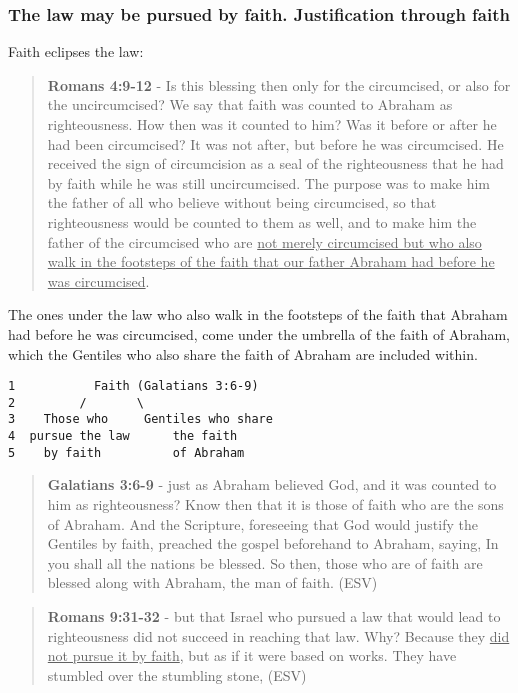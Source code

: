 \documentclass[11pt]{article}
\begin{document}
\subsubsection{The law may be pursued by faith. Justification through faith}
\label{sec:orgaf86b33}

Faith eclipses the law:

\begin{quote}
\textbf{Romans 4:9-12} - Is this blessing then only for the circumcised, or also for the uncircumcised? We say that faith was counted to Abraham as righteousness. How then was it counted to him? Was it before or after he had been circumcised? It was not after, but before he was circumcised. He received the sign of circumcision as a seal of the righteousness that he had by faith while he was still uncircumcised. The purpose was to make him the father of all who believe without being circumcised, so that righteousness would be counted to them as well, and to make him the father of the circumcised who are \uline{not merely circumcised but who also walk in the footsteps of the faith that our father Abraham had before he was circumcised}.
\end{quote}

The ones under the law who also walk in the footsteps of the faith that Abraham had before he was circumcised, come under the umbrella of the faith of Abraham, which the Gentiles who also share the faith of Abraham are included within.

\begin{verbatim}
1           Faith (Galatians 3:6-9)
2         /       \
3    Those who     Gentiles who share
4  pursue the law      the faith
5    by faith          of Abraham
\end{verbatim}

\begin{quote}
\textbf{Galatians 3:6-9} -  just as Abraham believed God, and it was counted to him as righteousness?  Know then that it is those of faith who are the sons of Abraham.  And the Scripture, foreseeing that God would justify the Gentiles by faith, preached the gospel beforehand to Abraham, saying, In you shall all the nations be blessed.  So then, those who are of faith are blessed along with Abraham, the man of faith.  (ESV)
\end{quote}

\begin{quote}
\textbf{Romans 9:31-32} - but that Israel who pursued a law that would lead to righteousness did not succeed in reaching that law. Why? Because they \uline{did not pursue it by faith}, but as if it were based on works. They have stumbled over the stumbling stone, (ESV)
\end{quote}
\end{document}
